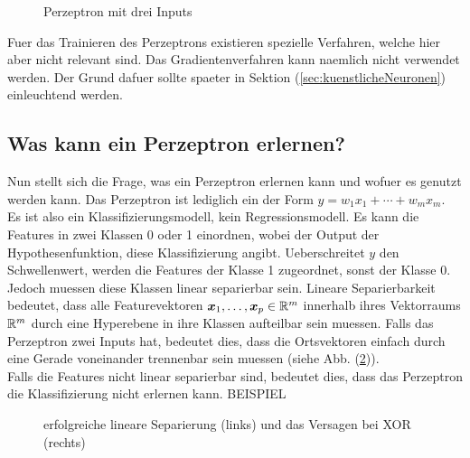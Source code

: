 \para{}
\begin{figure}[h!]
  \centering
  \caption{Perzeptron mit drei Inputs}
  \label{fi:perzeptron}
\end{figure}
\para{}
Fuer das Trainieren des Perzeptrons existieren spezielle Verfahren, welche hier
aber nicht relevant sind. Das Gradientenverfahren kann naemlich nicht verwendet
werden. Der Grund dafuer sollte spaeter in Sektion (\ref{sec:kuenstlicheNeuronen}) einleuchtend werden.

\para{}
\cite{wiki:perzeptron}
\cite{Nielsen}

\subsection{Was kann ein Perzeptron erlernen?}
Nun stellt sich die Frage, was ein Perzeptron erlernen kann und wofuer es genutzt werden kann.
Das Perzeptron ist lediglich ein  der Form
$y = w_1x_1 + \cdots + w_m x_m$. Es ist also ein Klassifizierungsmodell, kein Regressionsmodell.
Es kann die Features in zwei Klassen 0 oder 1 einordnen, wobei der Output der
Hypothesenfunktion, diese Klassifizierung angibt.
Ueberschreitet $y$ den Schwellenwert, werden die Features der Klasse 1 zugeordnet, sonst
der Klasse 0.
Jedoch muessen diese Klassen linear separierbar sein.
\para{}
Lineare Separierbarkeit bedeutet, dass alle Featurevektoren $\bm{x}_1,\ldots,\bm{x}_p \in \mathbb{R}^m$
innerhalb ihres Vektorraums $\mathbb{R}^m$ durch eine Hyperebene in ihre Klassen aufteilbar sein muessen.
Falls das Perzeptron zwei Inputs hat, bedeutet dies, dass die Ortsvektoren
einfach durch eine Gerade voneinander trennenbar sein muessen (siehe Abb.
(\ref{fig:linearer_Klassifikator})). \\
Falls die Features nicht linear separierbar sind, bedeutet dies, dass das
Perzeptron die Klassifizierung nicht erlernen kann.
BEISPIEL
\\
\begin{figure}[h!]
  \caption{erfolgreiche lineare Separierung (links) und das Versagen bei XOR (rechts)}
  \label{fig:linearer_Klassifikator}
\end{figure}
\para{}
\cite{wiki:perzeptron}
\cite{wiki:linear_separability}

